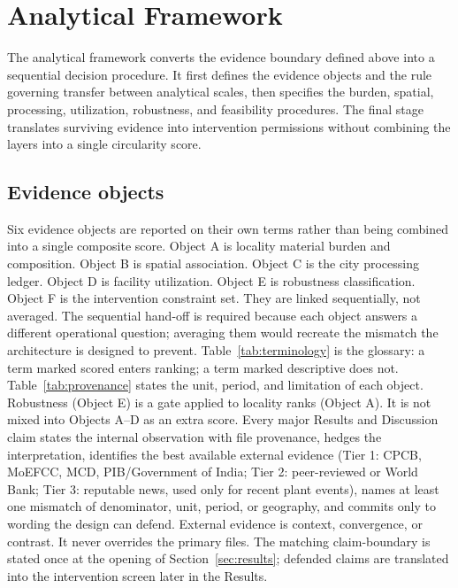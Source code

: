 \documentclass[12pt,a4paper]{article}
\begin{document}
\section{Analytical Framework}
\label{sec:analytical_framework}

The analytical framework converts the evidence boundary defined above into a sequential decision procedure. It first defines the evidence objects and the rule governing transfer between analytical scales, then specifies the burden, spatial, processing, utilization, robustness, and feasibility procedures. The final stage translates surviving evidence into intervention permissions without combining the layers into a single circularity score.

\subsection{Evidence objects}

Six evidence objects are reported on their own terms rather than being combined into a single composite score. Object A is locality material burden and composition. Object B is spatial association. Object C is the city processing ledger. Object D is facility utilization. Object E is robustness classification. Object F is the intervention constraint set. They are linked sequentially, not averaged. The sequential hand-off is required because each object answers a different operational question; averaging them would recreate the mismatch the architecture is designed to prevent. Table~\ref{tab:terminology} is the glossary: a term marked scored enters ranking; a term marked descriptive does not. Table~\ref{tab:provenance} states the unit, period, and limitation of each object. Robustness (Object E) is a gate applied to locality ranks (Object A). It is not mixed into Objects A--D as an extra score. Every major Results and Discussion claim states the internal observation with file provenance, hedges the interpretation, identifies the best available external evidence (Tier 1: CPCB, MoEFCC, MCD, PIB/Government of India; Tier 2: peer-reviewed or World Bank; Tier 3: reputable news, used only for recent plant events), names at least one mismatch of denominator, unit, period, or geography, and commits only to wording the design can defend. External evidence is context, convergence, or contrast. It never overrides the primary files. The matching claim-boundary is stated once at the opening of Section~\ref{sec:results}; defended claims are translated into the intervention screen later in the Results.
\end{document}
